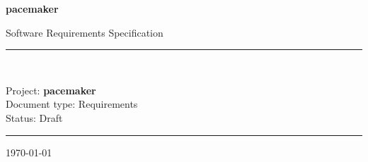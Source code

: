 \begin{titlepage}
  \centering
  \vspace*{3cm}
  {\Huge\bfseries\color{reqblue} pacemaker\par}
  \vspace{0.5cm}
  {\Large Software Requirements Specification\par}
  \vspace{1.5cm}
  \rule{\linewidth}{0.5pt}\\[0.4cm]
  {\large Project: \textbf{pacemaker}\\
         Document type: Requirements\\
         Status: Draft\par}
  \rule{\linewidth}{0.5pt}
  \vfill
  {\small\today}
\end{titlepage}

\tableofcontents
\newpage